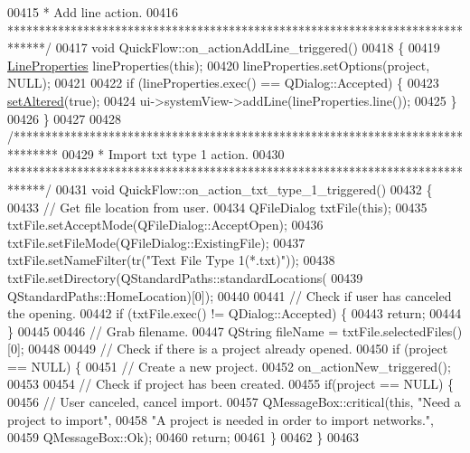 \begin{DoxyCode}
00415 \textcolor{comment}{ * Add line action.}
00416 \textcolor{comment}{ ******************************************************************************/}
00417 \textcolor{keywordtype}{void} QuickFlow::on\_actionAddLine\_triggered()
00418 \{
00419   \hyperlink{class_line_properties}{LineProperties} lineProperties(\textcolor{keyword}{this});
00420   lineProperties.setOptions(project, NULL);
00421 
00422   \textcolor{keywordflow}{if} (lineProperties.exec() == QDialog::Accepted) \{
00423     \hyperlink{group___window_ga4b63ea5ca52a9eea14db0a22b5a133f8}{setAltered}(\textcolor{keyword}{true});
00424     ui->systemView->addLine(lineProperties.line());
00425   \}
00426 \}
00427 
00428 \textcolor{comment}{/*******************************************************************************}
00429 \textcolor{comment}{ * Import txt type 1 action.}
00430 \textcolor{comment}{ ******************************************************************************/}
00431 \textcolor{keywordtype}{void} QuickFlow::on\_action\_txt\_type\_1\_triggered()
00432 \{
00433   \textcolor{comment}{// Get file location from user.}
00434   QFileDialog txtFile(\textcolor{keyword}{this});
00435   txtFile.setAcceptMode(QFileDialog::AcceptOpen);
00436   txtFile.setFileMode(QFileDialog::ExistingFile);
00437   txtFile.setNameFilter(tr(\textcolor{stringliteral}{"Text File Type 1(*.txt)"}));
00438   txtFile.setDirectory(QStandardPaths::standardLocations(
00439                          QStandardPaths::HomeLocation)[0]);
00440 
00441   \textcolor{comment}{// Check if user has canceled the opening.}
00442   \textcolor{keywordflow}{if} (txtFile.exec() != QDialog::Accepted) \{
00443     \textcolor{keywordflow}{return};
00444   \}
00445 
00446   \textcolor{comment}{// Grab filename.}
00447   QString fileName = txtFile.selectedFiles()[0];
00448 
00449   \textcolor{comment}{// Check if there is a project already opened.}
00450   \textcolor{keywordflow}{if} (project == NULL) \{
00451     \textcolor{comment}{// Create a new project.}
00452     on\_actionNew\_triggered();
00453 
00454     \textcolor{comment}{// Check if project has been created.}
00455     \textcolor{keywordflow}{if}(project == NULL) \{
00456       \textcolor{comment}{// User canceled, cancel import.}
00457       QMessageBox::critical(\textcolor{keyword}{this}, \textcolor{stringliteral}{"Need a project to import"},
00458                             \textcolor{stringliteral}{"A project is needed in order to import networks."},
00459                             QMessageBox::Ok);
00460       \textcolor{keywordflow}{return};
00461     \}
00462   \}
00463 

\end{DoxyCode}
